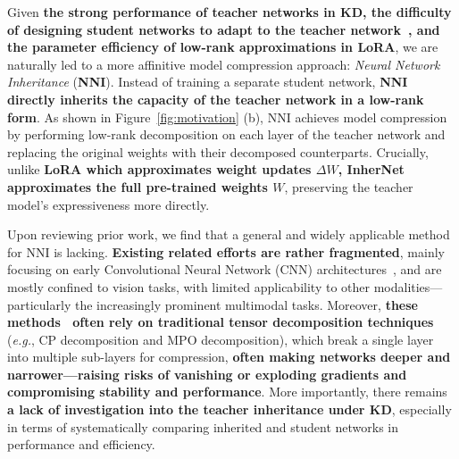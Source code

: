 \documentclass{article} %
\begin{document}
Given \textbf{the strong performance of teacher networks in KD, the difficulty of designing student networks to adapt to the teacher network~\citep{gu2020search, liu2022cross}, and the parameter efficiency of low-rank approximations in LoRA}, we are naturally led to a more affinitive model compression approach: \textit{Neural Network Inheritance} (\textbf{NNI}). Instead of training a separate student network, \textbf{NNI directly inherits the capacity of the teacher network in a low-rank form}. As shown in Figure~\ref{fig:motivation} (b), NNI achieves model compression by performing low-rank decomposition on each layer of the teacher network and replacing the original weights with their decomposed counterparts. Crucially, unlike \textbf{LoRA which approximates weight updates $\Delta W$, InherNet approximates the full pre-trained weights $W$}, preserving the teacher model's expressiveness more directly.


Upon reviewing prior work, we find that a general and widely applicable method for NNI is lacking. \textbf{Existing related efforts are rather fragmented}, mainly focusing on early Convolutional Neural Network (CNN) architectures~\citep{jaderberg2014speeding, zhang2015accelerating, xu2019trained, yang2020learning}, and are mostly confined to vision tasks, with limited applicability to other modalities—particularly the increasingly prominent multimodal tasks. Moreover, \textbf{these methods~\citep{lebedev2014speeding, hu2024dota} often rely on traditional tensor decomposition techniques} (\textit{e.g.}, CP decomposition and MPO decomposition), which break a single layer into multiple sub-layers for compression, \textbf{often making networks deeper and narrower—raising risks of vanishing or exploding gradients and compromising stability and performance}. More importantly, there remains \textbf{a lack of  investigation into the teacher inheritance under KD}, especially in terms of systematically comparing inherited and student networks in performance and efficiency.
\end{document}
